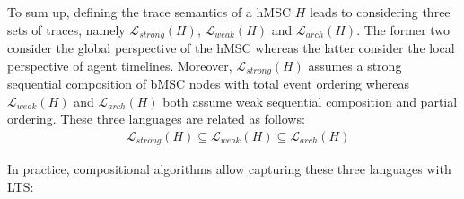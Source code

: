 To sum up, defining the trace semantics of a hMSC $H$ leads to considering three sets of traces, namely $\mathcal{L}_{strong}(H)$, $\mathcal{L}_{weak}(H)$ and $\mathcal{L}_{arch}(H)$. The former two consider the global perspective of the hMSC whereas the latter consider the local perspective of agent timelines. Moreover, $\mathcal{L}_{strong}(H)$ assumes a strong sequential composition of bMSC nodes with total event ordering whereas $\mathcal{L}_{weak}(H)$ and $\mathcal{L}_{arch}(H)$ both assume weak sequential composition and partial ordering. These three languages are related as follows:
\begin{align*}
&\mathcal{L}_{strong}(H) \subseteq \mathcal{L}_{weak}(H) \subseteq \mathcal{L}_{arch}(H)
\end{align*}

In practice, compositional algorithms allow capturing these three languages with LTS:

